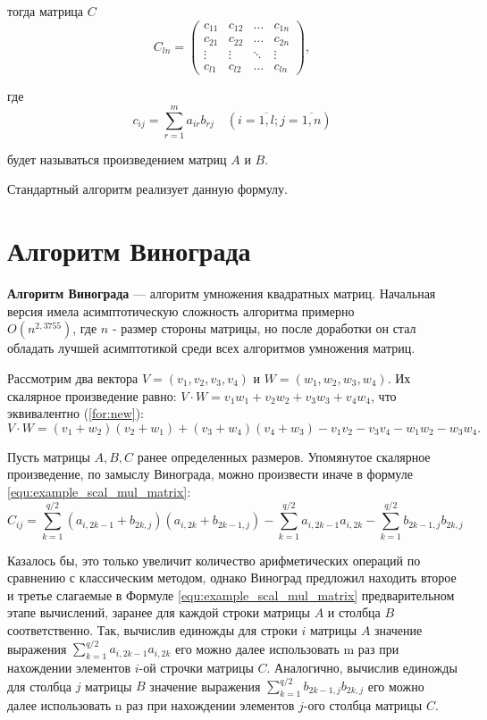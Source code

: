 тогда матрица $C$
\begin{equation}
	C_{ln} = \begin{pmatrix}
		c_{11} & c_{12} & \ldots & c_{1n}\\
		c_{21} & c_{22} & \ldots & c_{2n}\\
		\vdots & \vdots & \ddots & \vdots\\
		c_{l1} & c_{l2} & \ldots & c_{ln}
	\end{pmatrix},
\end{equation}

где
\begin{equation}
	\label{eq:M}
	c_{ij} =
	\sum_{r=1}^{m} a_{ir}b_{rj} \quad (i=\overline{1,l}; j=\overline{1,n})
\end{equation}

будет называться произведением матриц $A$ и $B$.

Стандартный алгоритм реализует данную формулу.


\section{Алгоритм Винограда}

\textbf{Алгоритм Винограда} — алгоритм умножения квадратных матриц. Начальная версия имела асимптотическую сложность алгоритма примерно \\$O(n^{2,3755})$, где $n$ - размер стороны матрицы, но после доработки он стал обладать лучшей асимптотикой среди всех алгоритмов умножения матриц\cite{vinograd-matrix}.

Рассмотрим два вектора $V = (v_1, v_2, v_3, v_4)$ и $W = (w_1, w_2, w_3, w_4)$.
Их скалярное произведение равно: $V \cdot W = v_1w_1 + v_2w_2 + v_3w_3 + v_4w_4$, что эквивалентно (\ref{for:new}):
\begin{equation}
	\label{for:new}
	V \cdot W = (v_1 + w_2)(v_2 + w_1) + (v_3 + w_4)(v_4 + w_3) - v_1v_2 - v_3v_4 - w_1w_2 - w_3w_4.
\end{equation}


Пусть матрицы $A, B, C$ ранее определенных размеров. Упомянутое скалярное произведение, по замыслу Винограда, можно произвести иначе в формуле \ref{equ:example_scal_mul_matrix}:
\begin{equation} 
	\label{equ:example_scal_mul_matrix}
	C_{ij} = \sum_{k=1}^{q/2}(a_{i,2k-1} + b_{2k,j})(a_{i,2k} + b_{2k-1,j}) - \sum_{k=1}^{q/2} a_{i,2k-1}a_{i,2k} - \sum_{k=1}^{q/2} b_{2k-1,j}b_{2k,j}
\end{equation}

Казалось бы, это только увеличит количество арифметических операций по сравнению с классическим методом, однако Виноград предложил находить второе и третье слагаемые в Формуле \ref{equ:example_scal_mul_matrix} предварительном этапе вычислений, заранее для каждой строки матрицы $A$ и столбца $B$ соответственно. Так, вычислив единожды для строки $i$ матрицы $A$ значение выражения $\sum_{k=1}^{q/2}a_{i,2k-1}a_{i,2k}$ его можно далее использовать m раз при нахождении элементов $i$-ой строчки матрицы $C$. Аналогично, вычислив единожды для
столбца $j$ матрицы $B$ значение выражения $\sum_{k=1}^{q/2} b_{2k-1,j}b_{2k,j}$ его можно
далее использовать n раз при нахождении элементов $j$-ого столбца матрицы $C$\cite{book_vinograd}.

